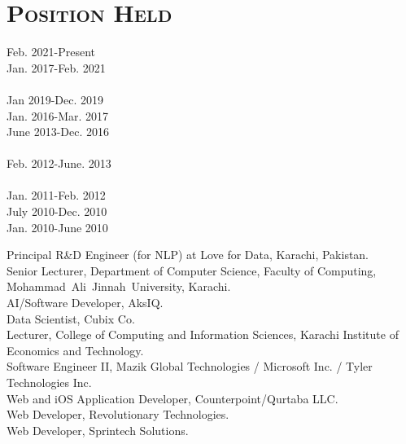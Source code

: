\documentclass[a4paper, 10pt]{article}
\begin{document}
\section*{\normalfont\textsc{Position Held}}
\hfill\begin{minipage}{0.23\textwidth}
Feb. 2021-Present\textcolor{lightgray}{\dotfill}\\
Jan. 2017-Feb. 2021\textcolor{lightgray}{\dotfill}\\\\
Jan 2019-Dec. 2019\textcolor{lightgray}{\dotfill}\\
Jan. 2016-Mar. 2017\textcolor{lightgray}{\dotfill}\\
June 2013-Dec. 2016\textcolor{lightgray}{\dotfill}\\\\
Feb. 2012-June. 2013\textcolor{lightgray}{\dotfill}\\\\
Jan. 2011-Feb. 2012\textcolor{lightgray}{\dotfill}\\
July 2010-Dec. 2010\textcolor{lightgray}{\dotfill}\\
Jan. 2010-June 2010\textcolor{lightgray}{\dotfill}\\
\end{minipage}
\begin{minipage}{0.74\textwidth}
Principal R\&D Engineer (for NLP) at Love for Data, Karachi, Pakistan.\\
Senior Lecturer, Department of Computer Science, Faculty of Computing, Mohammad~Ali~Jinnah~University, Karachi.\\
AI/Software Developer, AksIQ.\\
Data Scientist, Cubix Co.\\
Lecturer, College of Computing and Information Sciences, Karachi Institute of Economics and Technology.\\
Software Engineer II, Mazik Global Technologies / Microsoft Inc. / Tyler Technologies Inc.\\
Web and iOS Application Developer, Counterpoint/Qurtaba LLC.\\
Web Developer, Revolutionary Technologies.\\
Web Developer, Sprintech Solutions.\\
\end{minipage}



\end{document}
